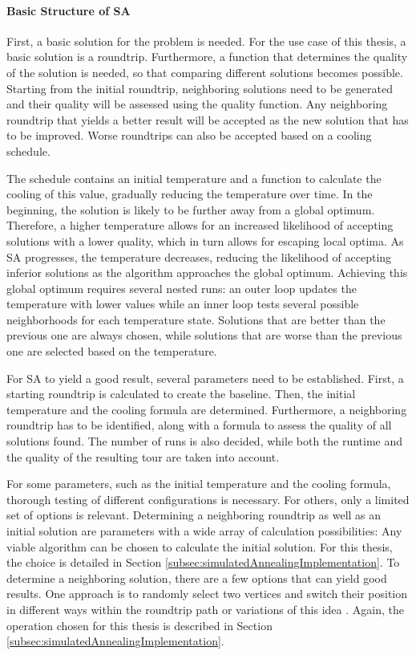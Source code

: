 \paragraph{Basic Structure of SA}

First, a basic solution for the problem is needed.
For the use case of this thesis, a basic solution is a roundtrip.
Furthermore, a function that determines the quality of the solution is needed, so that comparing different solutions becomes possible. 
Starting from the initial roundtrip, neighboring solutions need to be generated and their quality will be assessed using the quality function.
Any neighboring roundtrip that yields a better result will be accepted as the new solution that has to be improved.
Worse roundtrips can also be accepted based on a cooling schedule.

The schedule contains an initial temperature and a function to calculate the cooling of this value, gradually reducing the temperature over time.
In the beginning, the solution is likely to be further away from a global optimum.
Therefore, a higher temperature allows for an increased likelihood of accepting solutions with a lower quality, which in turn allows for escaping local optima.
As SA progresses, the temperature decreases, reducing the likelihood of accepting inferior solutions as the algorithm approaches the global optimum. 
Achieving this global optimum requires several nested runs:
an outer loop updates the temperature with lower values while an inner loop tests several possible neighborhoods for each temperature state. 
Solutions that are better than the previous one are always chosen, while solutions that are worse than the previous one are selected based on the temperature.


For SA to yield a good result, several parameters need to be established. 
First, a starting roundtrip is calculated to create the baseline.
Then, the initial temperature and the cooling formula are determined.
Furthermore, a neighboring roundtrip has to be identified, along with a formula to assess the quality of all solutions found.
The number of runs is also decided, while both the runtime and the quality of the resulting tour are taken into account.

For some parameters, such as the initial temperature and the cooling formula, thorough testing of different configurations is necessary.
For others, only a limited set of options is relevant.
Determining a neighboring roundtrip as well as an initial solution are parameters with a wide array of calculation possibilities:
Any viable algorithm can be chosen to calculate the initial solution. 
For this thesis, the choice is detailed in Section \ref{subsec:simulatedAnnealingImplementation}.
To determine a neighboring solution, there are a few options that can yield good results.
One approach is to randomly select two vertices and switch their position in different ways within the roundtrip path or variations of this idea \cite{zhan_list-based_2016}. 
Again, the operation chosen for this thesis is described in Section \ref{subsec:simulatedAnnealingImplementation}.



